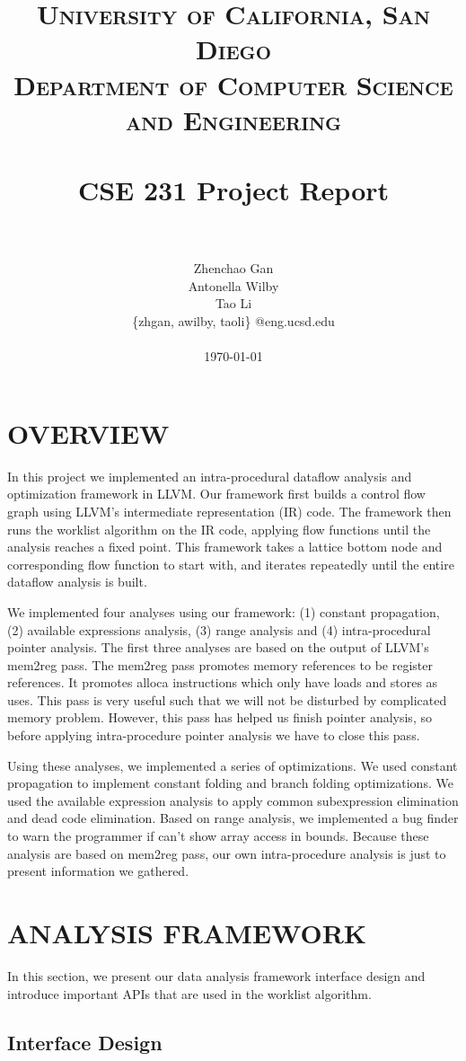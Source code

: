 \documentclass[paper=letter, fontsize=11pt]{scrartcl}
\title{
		\vspace{-0.5in} 	
		\usefont{OT1}{bch}{b}{n}
		\normalfont \normalsize \textsc{University of California, San Diego \\
								Department of Computer Science and Engineering } \\ [25pt]
		\horrule{0.5pt} \\[0.4cm]
		\huge CSE 231 Project Report\\
		\horrule{2pt} \\[0.5cm]
}
\author{
		\normalfont 						\normalsize
        				Zhenchao Gan\\[-3pt]		\normalsize
				Antonella Wilby\\[-3pt]		\normalsize
        				Tao Li\\[-3pt]				\normalsize
				\{zhgan, awilby, taoli\} @eng.ucsd.edu \\ \\
       		 \today
}
\date{}
\numberwithin{equation}{section}		%
\numberwithin{figure}{section}			%
\numberwithin{table}{section}				%
\begin{document}
\maketitle
\section{OVERVIEW}

In this project we implemented an intra-procedural dataflow analysis and optimization framework in LLVM.  Our framework first builds a control flow graph using LLVM's intermediate representation (IR) code. The framework then runs the worklist algorithm on the IR code, applying flow functions until the analysis reaches a fixed point. This framework takes a lattice bottom node and corresponding flow function to start with, and iterates repeatedly until the entire dataflow analysis is built. 

We implemented four analyses using our framework: (1) constant propagation, (2) available expressions analysis, (3) range analysis and (4) intra-procedural pointer analysis. The first three analyses are based on the output of LLVM's mem2reg pass. The mem2reg pass promotes memory references to be register references. It promotes alloca instructions which only have loads and stores as uses. This pass is very useful such that we will not be disturbed by complicated memory problem. However, this pass has helped us finish pointer analysis, so before applying intra-procedure pointer analysis we have to close this pass.

Using these analyses, we implemented a series of optimizations. We used constant propagation to implement constant folding and branch folding optimizations. We used the available expression analysis to apply common subexpression elimination and dead code elimination.  Based on range analysis, we implemented a bug finder to warn the programmer if can't show array access in bounds. Because these analysis are based on mem2reg pass, our own intra-procedure analysis is just to present information we gathered.


\section{ANALYSIS FRAMEWORK}

In this section, we present our data analysis framework interface design and introduce important APIs that are used in the worklist algorithm.

\subsection{Interface Design}
\end{document}
